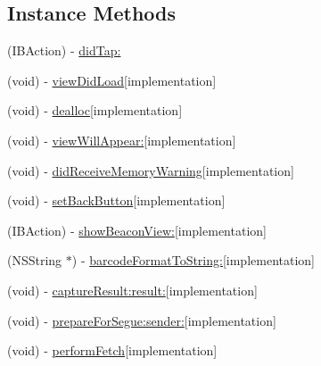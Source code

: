 \subsection*{Instance Methods}
\begin{DoxyCompactItemize}
\item 
(I\+B\+Action) -\/ \hyperlink{interface_barcode_view_controller_aab661931483c96127ffa048e15d87917}{did\+Tap\+:}
\item 
(void) -\/ \hyperlink{interface_barcode_view_controller_ae823b1c85bf9a87c24efa38d24343a54}{view\+Did\+Load}{\ttfamily  \mbox{[}implementation\mbox{]}}
\item 
(void) -\/ \hyperlink{interface_barcode_view_controller_a2a70c76316176f47d4126e8fed1bb55a}{dealloc}{\ttfamily  \mbox{[}implementation\mbox{]}}
\item 
(void) -\/ \hyperlink{interface_barcode_view_controller_a50e3fe1c64b95f0d3d59466dbc2c900b}{view\+Will\+Appear\+:}{\ttfamily  \mbox{[}implementation\mbox{]}}
\item 
(void) -\/ \hyperlink{interface_barcode_view_controller_a6fe8fd4a656ef6c0ac06462e5101d6ad}{did\+Receive\+Memory\+Warning}{\ttfamily  \mbox{[}implementation\mbox{]}}
\item 
(void) -\/ \hyperlink{interface_barcode_view_controller_a3388d45363c38c987deb03a74e4b3498}{set\+Back\+Button}{\ttfamily  \mbox{[}implementation\mbox{]}}
\item 
(I\+B\+Action) -\/ \hyperlink{interface_barcode_view_controller_a61c8bad86165dddbcdb6f64f891ba6d2}{show\+Beacon\+View\+:}{\ttfamily  \mbox{[}implementation\mbox{]}}
\item 
(N\+S\+String $\ast$) -\/ \hyperlink{interface_barcode_view_controller_ae2135d864655c5618b2800e09d3fc9e7}{barcode\+Format\+To\+String\+:}{\ttfamily  \mbox{[}implementation\mbox{]}}
\item 
(void) -\/ \hyperlink{interface_barcode_view_controller_a50f416e51dbeea0029f99e0cea014e08}{capture\+Result\+:result\+:}{\ttfamily  \mbox{[}implementation\mbox{]}}
\item 
(void) -\/ \hyperlink{interface_barcode_view_controller_a0ec1c92483ae880605699a401d3418a6}{prepare\+For\+Segue\+:sender\+:}{\ttfamily  \mbox{[}implementation\mbox{]}}
\item 
(void) -\/ \hyperlink{interface_barcode_view_controller_a5e6503242dd8c610ad4cea71aacc7bb1}{perform\+Fetch}{\ttfamily  \mbox{[}implementation\mbox{]}}
\end{DoxyCompactItemize}
